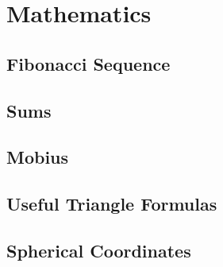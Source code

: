 \chapter{Mathematics}
\section{Fibonacci Sequence}
    
\section{Sums}
    
\section{Mobius}
    
\section{Useful Triangle Formulas}
    
\section{Spherical Coordinates}
